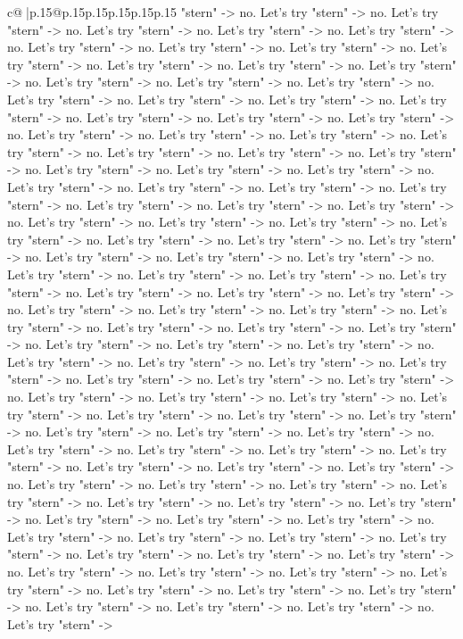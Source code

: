 \documentclass{article}
\begin{document}
{\begin{supertabular}{c@{$\;$}|p{.15\linewidth}@{}p{.15\linewidth}p{.15\linewidth}p{.15\linewidth}p{.15\linewidth}p{.15\linewidth}}
{{{"stern" {-}> no. Let's try "stern" {-}> no. Let's try "stern" {-}> no. Let's try "stern" {-}> no. Let's try "stern" {-}> no. Let's try "stern" {-}> no. Let's try "stern" {-}> no. Let's try "stern" {-}> no. Let's try "stern" {-}> no. Let's try "stern" {-}> no. Let's try "stern" {-}> no. Let's try "stern" {-}> no. Let's try "stern" {-}> no. Let's try "stern" {-}> no. Let's try "stern" {-}> no. Let's try "stern" {-}> no. Let's try "stern" {-}> no. Let's try "stern" {-}> no. Let's try "stern" {-}> no. Let's try "stern" {-}> no. Let's try "stern" {-}> no. Let's try "stern" {-}> no. Let's try "stern" {-}> no. Let's try "stern" {-}> no. Let's try "stern" {-}> no. Let's try "stern" {-}> no. Let's try "stern" {-}> no. Let's try "stern" {-}> no. Let's try "stern" {-}> no. Let's try "stern" {-}> no. Let's try "stern" {-}> no. Let's try "stern" {-}> no. Let's try "stern" {-}> no. Let's try "stern" {-}> no. Let's try "stern" {-}> no. Let's try "stern" {-}> no. Let's try "stern" {-}> no. Let's try "stern" {-}> no. Let's try "stern" {-}> no. Let's try "stern" {-}> no. Let's try "stern" {-}> no. Let's try "stern" {-}> no. Let's try "stern" {-}> no. Let's try "stern" {-}> no. Let's try "stern" {-}> no. Let's try "stern" {-}> no. Let's try "stern" {-}> no. Let's try "stern" {-}> no. Let's try "stern" {-}> no. Let's try "stern" {-}> no. Let's try "stern" {-}> no. Let's try "stern" {-}> no. Let's try "stern" {-}> no. Let's try "stern" {-}> no. Let's try "stern" {-}> no. Let's try "stern" {-}> no. Let's try "stern" {-}> no. Let's try "stern" {-}> no. Let's try "stern" {-}> no. Let's try "stern" {-}> no. Let's try "stern" {-}> no. Let's try "stern" {-}> no. Let's try "stern" {-}> no. Let's try "stern" {-}> no. Let's try "stern" {-}> no. Let's try "stern" {-}> no. Let's try "stern" {-}> no. Let's try "stern" {-}> no. Let's try "stern" {-}> no. Let's try "stern" {-}> no. Let's try "stern" {-}> no. Let's try "stern" {-}> no. Let's try "stern" {-}> no. Let's try "stern" {-}> no. Let's try "stern" {-}> no. Let's try "stern" {-}> no. Let's try "stern" {-}> no. Let's try "stern" {-}> no. Let's try "stern" {-}> no. Let's try "stern" {-}> no. Let's try "stern" {-}> no. Let's try "stern" {-}> no. Let's try "stern" {-}> no. Let's try "stern" {-}> no. Let's try "stern" {-}> no. Let's try "stern" {-}> no. Let's try "stern" {-}> no. Let's try "stern" {-}> no. Let's try "stern" {-}> no. Let's try "stern" {-}> no. Let's try "stern" {-}> no. Let's try "stern" {-}> no. Let's try "stern" {-}> no. Let's try "stern" {-}> no. Let's try "stern" {-}> no. Let's try "stern" {-}> no. Let's try "stern" {-}> no. Let's try "stern" {-}> no. Let's try "stern" {-}> no. Let's try "stern" {-}> no. Let's try "stern" {-}> no. Let's try "stern" {-}> no. Let's try "stern" {-}> no. Let's try "stern" {-}> no. Let's try "stern" {-}> no. Let's try "stern" {-}> no. Let's try "stern" {-}> no. Let's try "stern" {-}> no. Let's try "stern" {-}> no. Let's try "stern" {-}> no. Let's try "stern" {-}> no. Let's try "stern" {-}> no. Let's try "stern" {-}> no. Let's try "stern" {-}> no. Let's try "stern" {-}> no. Let's try "stern" {-}> no. Let's try "stern" {-}> no. Let's try "stern" {-}> no. Let's try "stern" {-}> }}}
\end{supertabular}}
\end{document}
